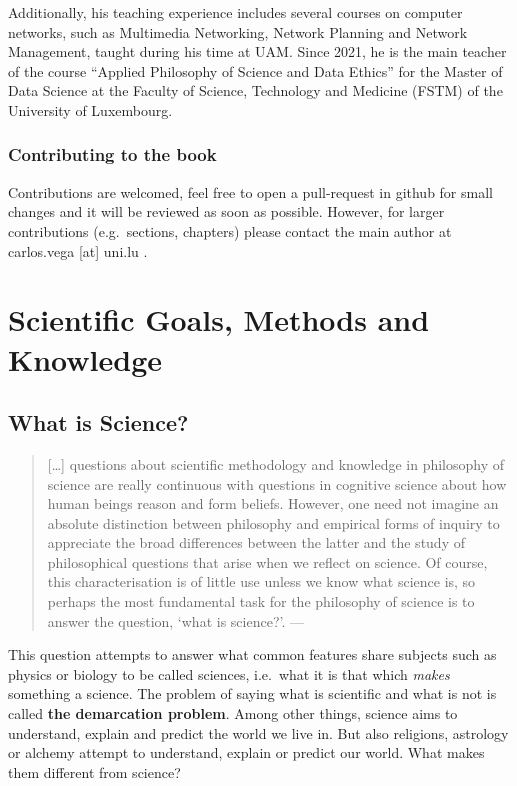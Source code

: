 \documentclass[
]{book}
\begin{document}
Additionally, his teaching experience includes several courses on computer networks, such as Multimedia Networking, Network Planning and Network Management, taught during his time at UAM. Since 2021, he is the main teacher of the course ``Applied Philosophy of Science and Data Ethics'' for the Master of Data Science at the Faculty of Science, Technology and Medicine (FSTM) of the University of Luxembourg.

\hypertarget{contributing-to-the-book}{%
\subsection*{Contributing to the book}\label{contributing-to-the-book}}

Contributions are welcomed, feel free to open a pull-request in github for small changes and it will be reviewed as soon as possible. However, for larger contributions (e.g.~sections, chapters) please contact the main author at carlos.vega {[}at{]} uni.lu .

\hypertarget{scientific-goals-methods-and-knowledge}{%
\chapter{Scientific Goals, Methods and Knowledge}\label{scientific-goals-methods-and-knowledge}}

\hypertarget{what-is-science}{%
\section{What is Science?}\label{what-is-science}}

\begin{quote}
{[}\ldots{]} questions about scientific methodology and knowledge in philosophy of science are really continuous with questions in cognitive science about how human beings reason and form beliefs. However, one need not imagine an absolute distinction between philosophy and empirical forms of inquiry to appreciate the broad differences between the latter and the study of philosophical questions that arise when we reflect on science.
Of course, this characterisation is of little use unless we know what science is, so perhaps the most fundamental task for the philosophy of science is to answer the question, `what is science?'. --- \citep{ladyman2012understanding}
\end{quote}

This question attempts to answer what common features share subjects such as physics or biology to be called sciences, i.e.~what it is that which \emph{makes} something a science. The problem of saying what is scientific and what is not is called \textbf{the demarcation problem}. Among other things, science aims to understand, explain and predict the world we live in. But also religions, astrology or alchemy attempt to understand, explain or predict our world. What makes them different from science?
\end{document}
